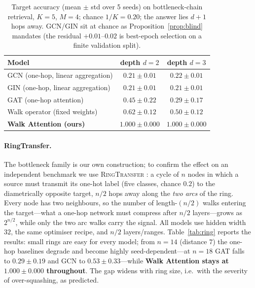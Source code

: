 \documentclass[runningheads]{llncs}
\begin{document}
\begin{table}[t]
\centering
\caption{Target accuracy (mean $\pm$ std over 5 seeds) on bottleneck-chain
retrieval, $K{=}5$, $M{=}4$; chance $1/K=0.20$; the answer lies $d{+}1$ hops
away. GCN/GIN sit at chance as Proposition~\ref{prop:blind} mandates (the
residual $+0.01$--$0.02$ is best-epoch selection on a finite validation
split).}
\label{tab:main}
\begin{tabular}{lcc}
\toprule
\textbf{Model} & \textbf{depth $d=2$} & \textbf{depth $d=3$} \\
\midrule
GCN (one-hop, linear aggregation)  & $0.21\pm0.01$ & $0.22\pm0.01$ \\
GIN (one-hop, linear aggregation)  & $0.21\pm0.01$ & $0.21\pm0.01$ \\
GAT (one-hop attention)            & $0.45\pm0.22$ & $0.29\pm0.17$ \\
Walk operator (fixed weights)      & $0.62\pm0.12$ & $0.50\pm0.12$ \\
\textbf{Walk Attention (ours)}     & $\mathbf{1.000\pm0.000}$ & $\mathbf{1.000\pm0.000}$ \\
\bottomrule
\end{tabular}
\end{table}

\paragraph{RingTransfer.}
The bottleneck family is our own construction; to confirm the effect on an
independent benchmark we use \textsc{RingTransfer}
\cite{bodnar2021cw,digiovanni2023oversquashing}: a cycle of $n$ nodes in which a source must
transmit its one-hot label (five classes, chance $0.2$) to the diametrically
opposite target, $n/2$ hops away along the \emph{two arcs} of the ring. Every
node has two neighbours, so the number of length-$(n/2)$ walks entering the
target---what a one-hop network must compress after $n/2$ layers---grows as
$2^{n/2}$, while only the two arc walks carry the signal. All models use hidden
width $32$, the same optimiser recipe, and $n/2$ layers/ranges.
Table~\ref{tab:ring} reports the results: small rings are easy for every model;
from $n{=}14$ (distance $7$) the one-hop baselines degrade and become highly
seed-dependent---at $n{=}18$ GAT falls to $0.29\pm0.19$ and GCN to
$0.53\pm0.33$---while \textbf{Walk Attention stays at $1.000\pm0.000$
throughout}. The gap widens with ring size, i.e.\ with the severity of
over-squashing, as predicted.
\end{document}
